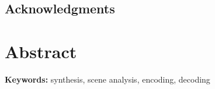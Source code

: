 \documentclass[a4paper,10pt,final]{ThesisStyle}
\begin{document}

\dominitoc
{}
 \cleardoublepage
 
 





\section*{Acknowledgments}
\lipsum[1-3]







\chapter*{Abstract}
\lipsum[1-3]

{\large\textbf{Keywords:}}
synthesis, scene analysis, encoding, decoding

\cleardoublepage


\end{document}
